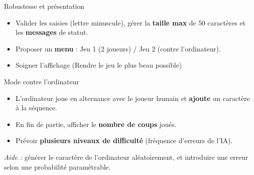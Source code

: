 \begin{UPSTICahierDesCharges}{Robustesse et présentation}
  \begin{itemize}
    \item Valider les saisies (lettre minuscule), gérer la \textbf{taille max} de 50 caractères et les \textbf{messages} de statut.
    \item Proposer un \textbf{menu} : Jeu 1 (2 joueurs) / Jeu 2 (contre l’ordinateur).
    \item Soigner l'affichage (Rendre le jeu le plus beau possible) 
  \end{itemize}
\end{UPSTICahierDesCharges}

\begin{UPSTICahierDesCharges}{Mode contre l’ordinateur}
\begin{itemize}
  \item L’ordinateur joue en alternance avec le joueur humain et \textbf{ajoute} un caractère à la séquence.
  \item En fin de partie, afficher le \textbf{nombre de coups} joués.
  \item Prévoir \textbf{plusieurs niveaux de difficulté} (fréquence d’erreurs de l’IA).
\end{itemize}
\textit{Aide :} générer le caractère de l’ordinateur aléatoirement, et introduire une \og erreur \fg{} selon une probabilité paramétrable.
\end{UPSTICahierDesCharges}

